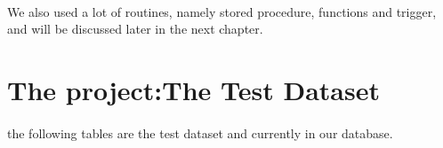       \paragraph{}
        We also used a lot of routines, namely stored procedure, functions and trigger, and will be discussed later in the next chapter.\\
\newpage
    \section{The project:The Test Dataset}
      \paragraph{}
        the following tables are the test dataset and currently in our database.\\
